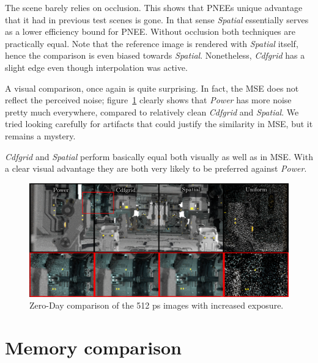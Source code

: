 The scene barely relies on occlusion. This shows that PNEEs unique advantage that it had in previous test scenes is gone. In that sense \textit{Spatial} essentially serves as a lower efficiency bound for PNEE. Without occlusion both techniques are practically equal. Note that the reference image is rendered with \textit{Spatial} itself, hence the comparison is even biased towards \textit{Spatial}. Nonetheless, \textit{Cdfgrid} has a slight edge even though interpolation was active. 

A visual comparison, once again is quite surprising. In fact, the MSE does not reflect the perceived noise; figure~\ref{fig:zdcomp} clearly shows that \textit{Power} has more noise pretty much everywhere, compared to relatively clean \textit{Cdfgrid} and \textit{Spatial}. We tried looking carefully for artifacts that could justify the similarity in MSE, but it remains a mystery.

\textit{Cdfgrid} and \textit{Spatial} perform basically equal both visually as well as in MSE. With a clear visual advantage they are both very likely to be preferred against \textit{Power}.

\begin{figure}
    \centering
    \includegraphics[width=1\textwidth]{figures/comparisons/ZDcomp_slim.pdf}
    \caption{Zero-Day comparison of the 512 ps images with increased exposure. }
    \label{fig:zdcomp}
\end{figure}


\FloatBarrier
\section{Memory comparison}

